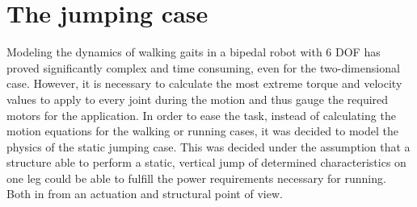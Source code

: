 \section{The jumping case} %
\label{sec:jumping_case}
Modeling the dynamics of walking gaits in a bipedal robot with 6 DOF has proved significantly complex and time consuming, even for the two-dimensional case.
However, it is necessary to calculate the most extreme torque and velocity values to apply to every joint during the motion and thus gauge the required motors for the application.
In order to ease the task, instead of calculating the motion equations for the walking or running cases, it was decided to model the physics of the static jumping case.
This was decided under the assumption that a structure able to perform a static, vertical jump of determined characteristics on one leg could be able to fulfill the power requirements necessary for running. Both in from an actuation and structural point of view.
